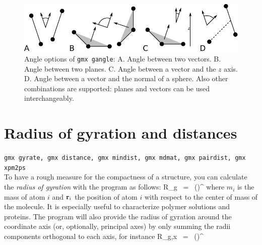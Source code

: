 \begin{figure}
\centerline{
{\includegraphics{plots/sgangle}}}
\caption[Angle options of {\tt gmx gangle}.]{Angle options of {\tt gmx gangle}:
A. Angle between two vectors.
B. Angle between two planes.
C. Angle between a vector and the $z$ axis.
D. Angle between a vector and the normal of a sphere.
Also other combinations are supported: planes and vectors can be used
interchangeably.}
\label{fig:sgangle}
\end{figure}


\section{Radius of gyration and distances}
\label{sec:rg}
{\tt gmx gyrate, gmx distance, gmx mindist, gmx mdmat, gmx pairdist, gmx xpm2ps}\\
To have a rough measure for the compactness of a structure, you can calculate 
the {\em radius of gyration} with the program {\tt {}} as follows:
\beq
R_g ~=~ \left({}\right)^{\half}
\label{eqn:rg}
\eeq
where $m_i$ is the mass of atom $i$ and ${\bf r}_i$ the position of 
atom $i$ with respect to the center of mass of the molecule. It is especially 
useful to characterize polymer solutions and proteins. The program will also
provide the radius of gyration around the coordinate axis (or, optionally, principal axes)
by only summing the radii components orthogonal to each axis, for instance
\beq
R_{g,x} ~=~ \left({}\right)^{\half}
\label{eqn:rg}
\eeq

